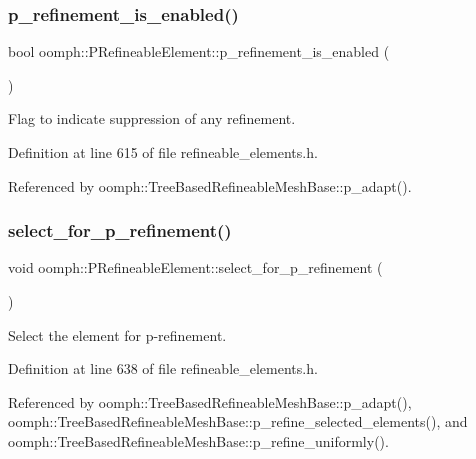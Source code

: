 \subsubsection{\texorpdfstring{p\+\_\+refinement\+\_\+is\+\_\+enabled()}{p\_refinement\_is\_enabled()}}
{\footnotesize\ttfamily bool oomph\+::\+P\+Refineable\+Element\+::p\+\_\+refinement\+\_\+is\+\_\+enabled (\begin{DoxyParamCaption}{ }\end{DoxyParamCaption})\hspace{0.3cm}{\ttfamily [inline]}}



Flag to indicate suppression of any refinement. 



Definition at line 615 of file refineable\+\_\+elements.\+h.



Referenced by oomph\+::\+Tree\+Based\+Refineable\+Mesh\+Base\+::p\+\_\+adapt().

\mbox{\label{classoomph_1_1PRefineableElement_a89ecf3e300ea9c7dd37ce981053377f4}} 
\subsubsection{\texorpdfstring{select\+\_\+for\+\_\+p\+\_\+refinement()}{select\_for\_p\_refinement()}}
{\footnotesize\ttfamily void oomph\+::\+P\+Refineable\+Element\+::select\+\_\+for\+\_\+p\+\_\+refinement (\begin{DoxyParamCaption}{ }\end{DoxyParamCaption})\hspace{0.3cm}{\ttfamily [inline]}}



Select the element for p-\/refinement. 



Definition at line 638 of file refineable\+\_\+elements.\+h.



Referenced by oomph\+::\+Tree\+Based\+Refineable\+Mesh\+Base\+::p\+\_\+adapt(), oomph\+::\+Tree\+Based\+Refineable\+Mesh\+Base\+::p\+\_\+refine\+\_\+selected\+\_\+elements(), and oomph\+::\+Tree\+Based\+Refineable\+Mesh\+Base\+::p\+\_\+refine\+\_\+uniformly().


